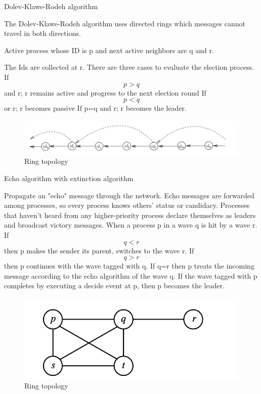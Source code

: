 \documentclass[11pt]{beamer}              %
\begin{document}
\begin{frame}{Dolev-Klawe-Rodeh algorithm}
\item  The Dolev-Klawe-Rodeh algorithm uses directed rings which messages cannot travel in both directions. 
\item Active process whose ID is p and next active neighbors are q and r. 
\item The Ids are collected at r. There are three cases to evaluate the election process.
If \[ p > q \] and r; r remains active and progress to the next election round
If \[ p < q \] or r; r becomes passive
If p=q and r; r becomes the leader. 
\begin{figure}
    \centering
    \includegraphics[scale=0.3]{figures/Screen2.jpg}
    \caption{Ring topology}
    \label{fig:Ring topology}
\end{figure}
\end{frame}

\begin{frame}{Echo algorithm with extinction algorithm}
\item Propagate an "echo" message through the network. 
Echo messages are forwarded among processes, so every process knows others' status or candidacy. 
Processes that haven't heard from any higher-priority process declare themselves as leaders and broadcast victory messages.
When a process p in a wave q is hit by a wave r.
If \[ q < r \] then p makes the sender its parent, switches to the wave r.
If \[ q > r \] then p continues with the wave tagged with q.
If q=r then p treats the incoming message according to the echo algorithm of the wave q.
If the wave tagged with p completes by executing a decide event at p, then p becomes the leader.
\begin{figure}
    \centering
    \includegraphics[scale=0.25]{figures/Screen3.jpg}
    \caption{Ring topology}
    \label{fig:Ring topology}
\end{figure}
\end{frame}
\end{document}
